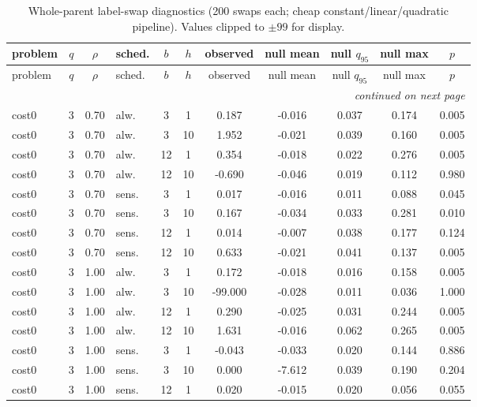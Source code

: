 \begin{scriptsize}
\setlength{\tabcolsep}{3pt}
\begin{longtable}{l cclcc ccccc}
\caption{Whole-parent label-swap diagnostics (200 swaps each; cheap constant/linear/quadratic pipeline). Values clipped to $\pm99$ for display.}\label{tab:app-swaps}\\
\toprule
problem & $q$ & $\rho$ & sched. & $b$ & $h$ & observed & null mean & null $q_{95}$ & null max & $p$ \\
\midrule
\endfirsthead
\toprule
problem & $q$ & $\rho$ & sched. & $b$ & $h$ & observed & null mean & null $q_{95}$ & null max & $p$ \\
\midrule
\endhead
\midrule
\multicolumn{11}{r}{\emph{continued on next page}}\\
\endfoot
\bottomrule
\endlastfoot
cost0 & 3 & 0.70 & alw. & 3 & 1 & 0.187 & -0.016 & 0.037 & 0.174 & 0.005 \\
cost0 & 3 & 0.70 & alw. & 3 & 10 & 1.952 & -0.021 & 0.039 & 0.160 & 0.005 \\
cost0 & 3 & 0.70 & alw. & 12 & 1 & 0.354 & -0.018 & 0.022 & 0.276 & 0.005 \\
cost0 & 3 & 0.70 & alw. & 12 & 10 & -0.690 & -0.046 & 0.019 & 0.112 & 0.980 \\
cost0 & 3 & 0.70 & sens. & 3 & 1 & 0.017 & -0.016 & 0.011 & 0.088 & 0.045 \\
cost0 & 3 & 0.70 & sens. & 3 & 10 & 0.167 & -0.034 & 0.033 & 0.281 & 0.010 \\
cost0 & 3 & 0.70 & sens. & 12 & 1 & 0.014 & -0.007 & 0.038 & 0.177 & 0.124 \\
cost0 & 3 & 0.70 & sens. & 12 & 10 & 0.633 & -0.021 & 0.041 & 0.137 & 0.005 \\
cost0 & 3 & 1.00 & alw. & 3 & 1 & 0.172 & -0.018 & 0.016 & 0.158 & 0.005 \\
cost0 & 3 & 1.00 & alw. & 3 & 10 & -99.000 & -0.028 & 0.011 & 0.036 & 1.000 \\
cost0 & 3 & 1.00 & alw. & 12 & 1 & 0.290 & -0.025 & 0.031 & 0.244 & 0.005 \\
cost0 & 3 & 1.00 & alw. & 12 & 10 & 1.631 & -0.016 & 0.062 & 0.265 & 0.005 \\
cost0 & 3 & 1.00 & sens. & 3 & 1 & -0.043 & -0.033 & 0.020 & 0.144 & 0.886 \\
cost0 & 3 & 1.00 & sens. & 3 & 10 & 0.000 & -7.612 & 0.039 & 0.190 & 0.204 \\
cost0 & 3 & 1.00 & sens. & 12 & 1 & 0.020 & -0.015 & 0.020 & 0.056 & 0.055 \\

\end{longtable}
\end{scriptsize}
